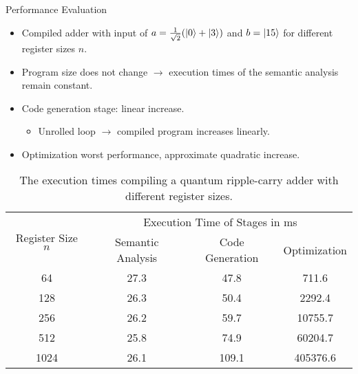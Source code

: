 \begin{frame}{Performance Evaluation}
    \begin{itemize}
        \item Compiled adder with input of $a = \frac{1}{\sqrt{2}} (\ket{0} + \ket{3})$ and $b = \ket{15}$ for different register sizes $n$.
        \item Program size does not change $\to$ execution times of the semantic analysis remain constant.
        \item Code generation stage: linear increase.
        \begin{itemize}
            \item Unrolled loop $\to$ compiled program increases linearly.
        \end{itemize}
        \item Optimization worst performance, approximate quadratic increase.
    \end{itemize}
    \vfill
    \begin{table}[htp]
        \centering     
        \begin{tabular}{c|ccc}
        \multirow{2}{*}{Register Size $n$} & \multicolumn{3}{c}{Execution Time of Stages in ms}                                                  \\ \cline{2-4} 
                                           & \multicolumn{1}{c|}{Semantic Analysis} & \multicolumn{1}{c|}{Code Generation} & Optimization \\ \hline
        64                                 & \multicolumn{1}{c|}{27.3}                & \multicolumn{1}{c|}{47.8}              & 711.6          \\
        128                                & \multicolumn{1}{c|}{26.3}                & \multicolumn{1}{c|}{50.4}              & 2292.4         \\
        256                                & \multicolumn{1}{c|}{26.2}                & \multicolumn{1}{c|}{59.7}              & 10755.7        \\
        512                                & \multicolumn{1}{c|}{25.8}                & \multicolumn{1}{c|}{74.9}              & 60204.7        \\
        1024                               & \multicolumn{1}{c|}{26.1}                & \multicolumn{1}{c|}{109.1}             & 405376.6      
    \end{tabular}
    \caption{The execution times compiling a quantum ripple-carry adder with different register sizes.}
    \end{table}
    
\end{frame}